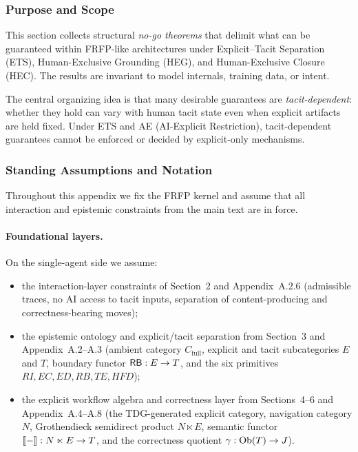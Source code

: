 

\subsubsection{Purpose and Scope}
This section collects structural \emph{no-go theorems} that delimit what can be guaranteed within FRFP-like architectures under Explicit--Tacit Separation (ETS), Human-Exclusive Grounding (HEG), and Human-Exclusive Closure (HEC). The results are invariant to model internals, training data, or intent.

The central organizing idea is that many desirable guarantees are \emph{tacit-dependent}: whether they hold can vary with human tacit state even when explicit artifacts are held fixed. Under ETS and AE (AI-Explicit Restriction), tacit-dependent guarantees cannot be enforced or decided by explicit-only mechanisms.

\subsubsection{Standing Assumptions and Notation}

Throughout this appendix we fix the FRFP kernel and assume that all interaction and
epistemic constraints from the main text are in force.

\paragraph{Foundational layers.}
On the single-agent side we assume:
\begin{itemize}
  \item the interaction-layer constraints of Section~2 and Appendix~A.2.6 (admissible traces, no AI
        access to tacit inputs, separation of content-producing and correctness-bearing moves);
  \item the epistemic ontology and explicit/tacit separation from Section~3 and Appendix~A.2--A.3
        (ambient category $C_{\mathrm{full}}$, explicit and tacit subcategories $E$ and $T$, boundary
        functor $\mathsf{RB} : E \to T$, and the six primitives $RI, EC, ED, RB, TE, HFD$);
  \item the explicit workflow algebra and correctness layer from Sections~4--6 and
        Appendix~A.4--A.8 (the TDG-generated explicit category, navigation category $N$, Grothendieck
        semidirect product $N \ltimes E$, semantic functor $\llbracket - \rrbracket : N \ltimes E \to T$, and the
        correctness quotient $\gamma : \mathrm{Ob}(T) \to J$).
\end{itemize}

